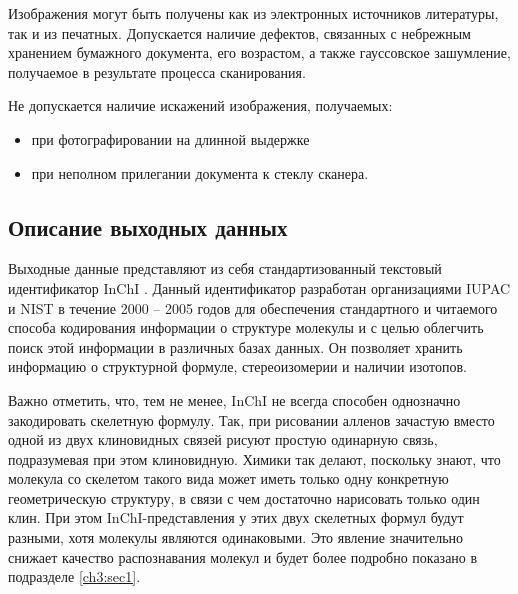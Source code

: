 Изображения могут быть получены как из электронных источников литературы, так и из печатных. Допускается наличие дефектов, связанных с небрежным хранением бумажного документа, его возрастом, а также гауссовское зашумление, получаемое в результате процесса сканирования.

Не допускается наличие искажений изображения, получаемых:

\begin{itemize}
	\item при фотографировании на длинной выдержке
	\item при неполном прилегании документа к стеклу сканера.
\end{itemize}

\subsection{Описание выходных данных}
Выходные данные представляют из себя стандартизованный текстовый идентификатор InChI \cite{inchi_trust, inchi_wiki}. Данный идентификатор разработан организациями IUPAC и NIST в течение 2000 -- 2005 годов для обеспечения стандартного и читаемого способа кодирования информации о структуре молекулы и с целью облегчить поиск этой информации в различных базах данных. Он позволяет хранить информацию о структурной формуле, стереоизомерии и наличии изотопов.

Важно отметить, что, тем не менее, InChI не всегда способен однозначно закодировать скелетную формулу. Так, при рисовании алленов зачастую вместо одной из двух клиновидных связей рисуют простую одинарную связь, подразумевая при этом клиновидную. Химики так делают, поскольку знают, что молекула со скелетом такого вида может иметь только одну конкретную геометрическую структуру, в связи с чем достаточно нарисовать только один клин. При этом InChI-представления у этих двух скелетных формул будут разными, хотя молекулы являются одинаковыми. Это явление значительно снижает качество распознавания молекул и будет более подробно показано в подразделе \ref{ch3:sec1}.

